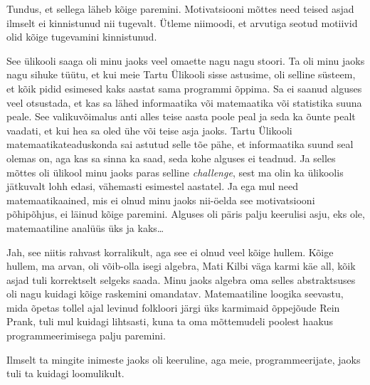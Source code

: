 
Tundus, et sellega läheb kõige paremini. Motivatsiooni mõttes need teised asjad 
ilmselt ei kinnistunud nii tugevalt. Ütleme niimoodi, et arvutiga seotud 
motiivid olid kõige tugevamini kinnistunud. 


See ülikooli saaga oli minu jaoks veel omaette nagu nagu stoori. Ta oli minu 
jaoks nagu sihuke tüütu, et 
kui meie  Tartu Ülikooli sisse astusime, oli selline süsteem, et kõik pidid 
esimesed kaks aastat sama programmi õppima. Sa ei saanud alguses veel 
otsustada, et kas sa lähed informaatika või matemaatika või  statistika suuna 
peale. See valikuvõimalus anti alles teise aasta poole peal ja seda ka õunte 
pealt vaadati, et kui hea sa oled ühe või teise asja jaoks. Tartu Ülikooli 
matemaatikateaduskonda sai astutud selle tõe pähe, et informaatika suund seal 
olemas on, aga kas sa sinna ka saad, seda kohe alguses ei teadnud. Ja selles 
mõttes oli ülikool minu jaoks paras selline \emph{challenge}, sest ma olin ka 
ülikoolis jätkuvalt  lohh edasi, vähemasti esimestel aastatel. Ja ega mul need 
matemaatikaained, mis ei olnud minu jaoks  nii-öelda see motivatsiooni 
põhipõhjus, ei läinud kõige paremini. Alguses oli päris palju keerulisi asju, 
eks ole, matemaatiline analüüs üks ja kaks\ldots 


Jah, see niitis  rahvast korralikult, aga see ei olnud veel kõige hullem. Kõige 
hullem, ma arvan, oli võib-olla isegi algebra, Mati Kilbi väga karmi käe all, kõik asjad tuli korrektselt selgeks saada. Minu jaoks 
algebra oma selles abstraktsuses oli nagu kuidagi kõige raskemini omandatav. 
Matemaatiline loogika seevastu, mida õpetas tollel ajal levinud folkloori järgi 
üks karmimaid õppejõude Rein Prank, tuli mul kuidagi 
lihtsasti, kuna ta oma mõttemudeli poolest haakus programmeerimisega palju 
paremini. 


Ilmselt ta mingite inimeste jaoks oli keeruline, aga meie, programmeerijate, 
jaoks tuli ta kuidagi loomulikult. 


